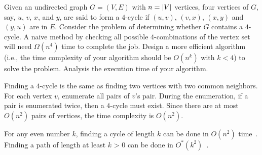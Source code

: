 \begin{Exercise}[origin={NCU CSIE 95}]
Given an undirected graph $G = (V, E)$ with $n = \lvert V\rvert$ vertices, four vertices of $G$, say, $u$, $v$, $x$, and $y$, are said to form a $4$-cycle if $(u, v)$, $(v, x)$, $(x, y)$ and $(y, u)$ are in $E$. Consider the problem of determining whether $G$ contains a $4$-cycle. A naive method by checking all possible $4$-combinations of the vertex set will need $\Omega(n^4)$ time to complete the job. Design a more efficient algorithm (i.e., the time complexity of your algorithm should be $O(n^k)$ with $k < 4$) to solve the problem. Analysis the execution time of your algorithm.
\end{Exercise}
\begin{Answer}
Finding a $4$-cycle is the same as finding two vertices with two common neighbors. For each vertex $v$, enumerate all pairs of $v$'s pair. During the enumeration, if a pair is enumerated twice, then a $4$-cycle must exist. Since there are at most $O(n^2)$ pairs of vertices, the time complexity is $O(n^2)$.
\begin{remark}
For any even number $k$, finding a cycle of length $k$ can be done in $O(n^2)$ time~\cite{Yuster1997}. Finding a path of length at least $k$ > 0 can be done in $O^*(k^2)$~\cite{RWilliams2009}.
\end{remark}
\end{Answer}


\printbibliography[heading=subbibliography]
